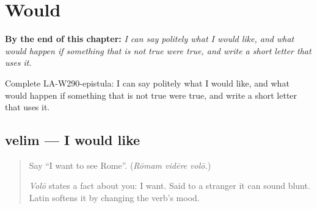 
\chapter{Would}
\label{ch:la-would}

\begin{chapteropening}
\textbf{By the end of this chapter:} \emph{I can say politely what I would like, and what would happen if something that is not true were true, and write a short letter that uses it.}

Complete LA-W290-epistula: I can say politely what I would like, and what would happen if something that is not true were true, and write a short letter that uses it.
\end{chapteropening}

\section[velim, possim, mālim]{velim — I would like}

\label{lesson:LA-C290-velim}



\begin{quote}
Say \textquotedblleft{}I want to see Rome\textquotedblright{}. (\emph{Rōmam vidēre volō.})

\emph{Volō} states a fact about you: I want. Said to a stranger it can sound blunt. Latin softens it by changing the verb's mood.
\end{quote}

